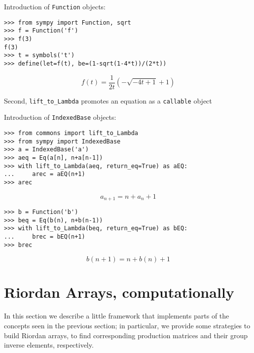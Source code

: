 
\begin{example}
Introduction of \verb|Function| objects:
\begin{verbatim}
>>> from sympy import Function, sqrt
>>> f = Function('f')
>>> f(3)
f(3)
>>> t = symbols('t')
>>> define(let=f(t), be=(1-sqrt(1-4*t))/(2*t))
\end{verbatim}
\begin{displaymath}
f{\left (t \right )} = \frac{1}{2 t} \left(- \sqrt{- 4 t + 1} + 1\right)
\end{displaymath}
\end{example}

Second, \verb|lift_to_Lambda| promotes an equation as a \verb|callable| object

\begin{example}
Introduction of \verb|IndexedBase| objects:
\begin{verbatim}
>>> from commons import lift_to_Lambda
>>> from sympy import IndexedBase
>>> a = IndexedBase('a')
>>> aeq = Eq(a[n], n+a[n-1])
>>> with lift_to_Lambda(aeq, return_eq=True) as aEQ:
...     arec = aEQ(n+1)
>>> arec
\end{verbatim}
\begin{displaymath}
    a_{n + 1} = n + a_{n} + 1
\end{displaymath}
\begin{verbatim}
>>> b = Function('b')
>>> beq = Eq(b(n), n+b(n-1))
>>> with lift_to_Lambda(beq, return_eq=True) as bEQ:
...     brec = bEQ(n+1)
>>> brec
\end{verbatim}
\begin{displaymath}
    b{\left (n + 1 \right )} = n + b{\left (n \right )} + 1
\end{displaymath}
\end{example}

\section{Riordan Arrays, computationally}

In this section we describe a little framework that implements parts
of the concepts seen in the previous section; in particular, we provide
some strategies to build Riordan arrays, to find corresponding production
matrices and their group inverse elements, respectively.

